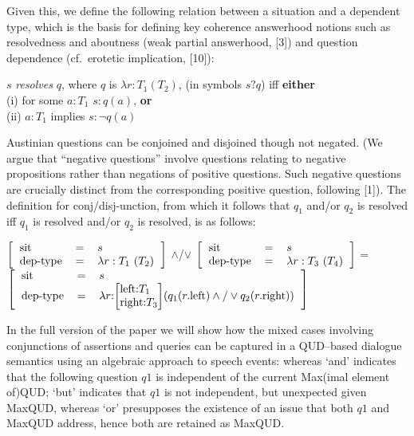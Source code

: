 \documentclass[a4wide]{article}
\makeatletter
\newcommand{\ignore}[1]{}
\newcommand{\record}[1]{$\left[\mbox{\begin{tabular}{lcl} #1
\end{tabular}}\right]$}
\newcommand{\smallrecord}[1]{$\left[\mbox{\begin{tabular}{@{}l@{}c@{}l@{}} #1
\end{tabular}}\right]$}
\newcommand{\field}[2]{#1 & = & #2}
\newcommand{\smalltfield}[2]{#1:#2 & &}
\makeatother
\begin{document}
Given this, we define the following relation between a situation and a
dependent type, which is the basis for defining key coherence
answerhood notions such as resolvedness and aboutness (weak partial
answerhood, [3]\ignore{\cite{gs00}}) and question dependence (cf.~erotetic implication, [10]\ignore{\cite{wisniewski-la}}):

$s$ \textit{resolves} $q$, where $q$ is $\lambda r:T_1(T_2)$, (in
  symbols $s ? q$)
  iff \textbf{either}\\ 
\hspace*{5em} (i) for some $a:T_1$  $s : q(a)$, \textbf{or} \\
\hspace*{5em}(ii) $a:T_1$ implies  $s : \neg q(a)$


Austinian questions can be conjoined and disjoined though not
negated.  (We argue that ``negative questions'' involve questions
relating to negative propositions rather than negations of positive
questions.  Such negative questions are crucially distinct from the
corresponding positive question, following [1]\ignore{\cite{cooper2012negative}}). The definition for conj/disj-unction, from which it follows that
$q_1$ and/or $q_2$ is resolved iff $q_1$ is resolved and/or $q_2$ is
resolved, is as follows:

 \record{\field{sit}{$s$} \\
        \field{dep-type}{     $\lambda r:T_1\
  (T_2)$       }} $\wedge$/$\vee$ \record{\field{sit}{$s$} \\
                                                  \field{dep-type}{   $\lambda r:T_3\ (T_4)$  }}
                                                = \\ 
\hspace*{5em}\record{\field{sit}{$s$} \\
                                                          \field{dep-type}{   $\lambda r$:\smallrecord{\smalltfield{left}{$T_1$} \\
                         \smalltfield{right}{$T_3$}}($q_1(r.\mathrm{left})\wedge /\vee q_2(r.\mathrm{right})$)    }}

In the full version of the paper we will show how the mixed
cases involving conjunctions of assertions and queries can be captured in a
QUD--based dialogue semantics using an algebraic approach to speech
events: whereas `and' indicates that the following question $q1$ is
independent of the current  Max(imal element of)QUD; `but'
indicates that $q1$   is not
independent, but unexpected given MaxQUD, whereas `or'  presupposes
the existence of an issue   that both $q1$ 
and   MaxQUD address, hence both are retained as MaxQUD. 
\end{document}
